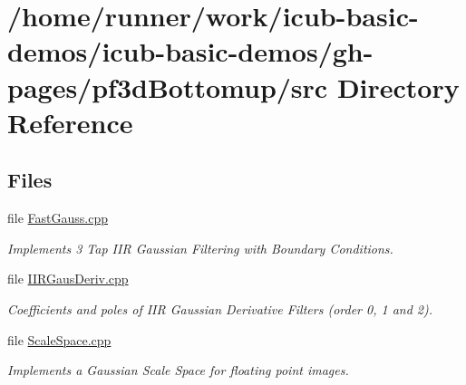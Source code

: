 \section{/home/runner/work/icub-\/basic-\/demos/icub-\/basic-\/demos/gh-\/pages/pf3d\+Bottomup/src Directory Reference}
\label{dir_11110cf4ec97ab9f4ccc991ff6fd73d9}
\subsection*{Files}
\begin{DoxyCompactItemize}
\item 
file \hyperlink{FastGauss_8cpp}{Fast\+Gauss.\+cpp}
\begin{DoxyCompactList}\small\item\em Implements 3 Tap I\+IR Gaussian Filtering with Boundary Conditions. \end{DoxyCompactList}\item 
file \hyperlink{IIRGausDeriv_8cpp}{I\+I\+R\+Gaus\+Deriv.\+cpp}
\begin{DoxyCompactList}\small\item\em Coefficients and poles of I\+IR Gaussian Derivative Filters (order 0, 1 and 2). \end{DoxyCompactList}\item 
file \hyperlink{ScaleSpace_8cpp}{Scale\+Space.\+cpp}
\begin{DoxyCompactList}\small\item\em Implements a Gaussian Scale Space for floating point images. \end{DoxyCompactList}\end{DoxyCompactItemize}
